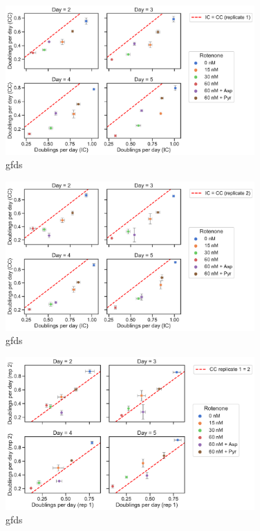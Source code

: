 \begin{figure}[ht]
    \centering
    \includegraphics[width=0.85\textwidth]{figures/sapp/IC/prlfr_ICvsCC-rep1-byday.pdf}
    \caption[Coulter counter vs. Incucyte proliferation rate, replicate 1.]{
    gfds
    }
    \label{fig:sapp:IC:ICvsCC1}
\end{figure}

\begin{figure}[ht]
    \centering
    \includegraphics[width=0.85\textwidth]{figures/sapp/IC/prlfr_ICvsCC-rep2-byday.pdf}
    \caption[Coulter counter vs. Incucyte proliferation rate, replicate 2.]{
    gfds
    }
    \label{fig:sapp:IC:ICvsCC2}
\end{figure}

\begin{figure}[ht]
    \centering
    \includegraphics[width=0.85\textwidth]{figures/sapp/IC/prlfr_CCvsCC-byday.pdf}
    \caption[Coulter counter proliferation rate, replicate 1 vs. 2.]{
    gfds
    }
    \label{fig:sapp:IC:CCvsCC2}
\end{figure}





